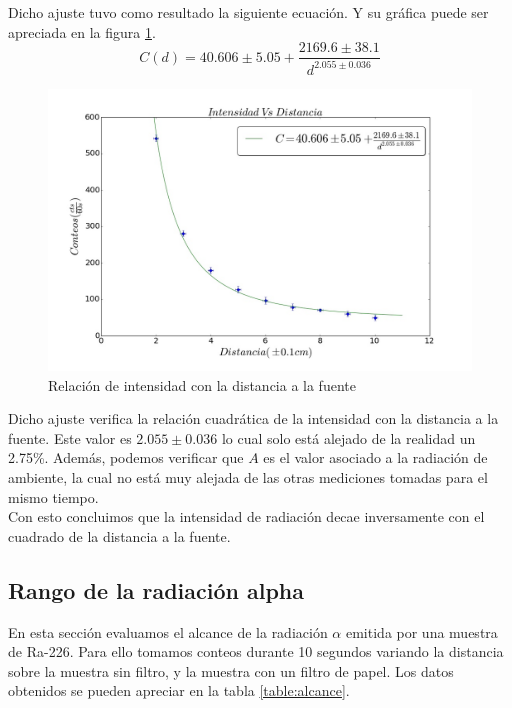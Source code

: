\documentclass[%
 reprint,
 amsmath,amssymb,
 aps,
]{revtex4-1}
\begin{document}
Dicho ajuste tuvo como resultado la siguiente ecuación. Y su gráfica puede ser apreciada en la figura \ref{fig:distancia}.\\

\begin{equation}
 	C(d) = 40.606\pm 5.05 + \frac{2169.6\pm38.1}{d^{2.055\pm0.036}}
\end{equation}

\begin{figure}[h!]
\centering
\includegraphics[width=1.1\linewidth]{distancia.jpg}
\caption{Relación de intensidad con la distancia a la fuente}
\label{fig:distancia}
\end{figure}

Dicho ajuste verifica la relación cuadrática de la intensidad con la distancia a la fuente. Este valor es $2.055\pm0.036$ lo cual solo está alejado de la realidad un 2.75\%. Además, podemos verificar que $A$ es el valor asociado a la radiación de ambiente, la cual no está muy alejada de las otras mediciones tomadas para el mismo tiempo.\\

Con esto concluimos que la intensidad de radiación decae inversamente con el cuadrado de la distancia a la fuente.\\
 
\subsection{\label{sec:level2}Rango de la radiación alpha}
En esta sección evaluamos el alcance de la radiación $\alpha$ emitida por una muestra de Ra-226. Para ello tomamos conteos durante 10 segundos variando la distancia sobre la muestra sin filtro, y la muestra con un filtro de papel. Los datos obtenidos se pueden apreciar en la tabla \ref{table:alcance}.\\
\end{document}
